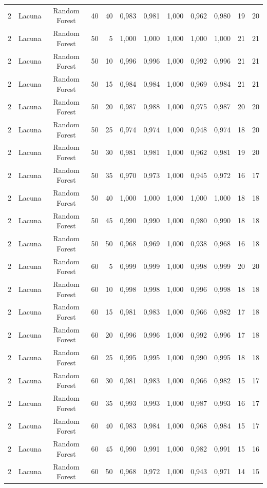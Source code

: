 \begin{longtable}{ccclrrrrrrrr}
2 & Lacuna & Random Forest & 40 & 40 & 0,983 & 0,981 & 1,000 & 0,962 & 0,980 & 19 & 20 \\
2 & Lacuna & Random Forest & 50 & 5 & 1,000 & 1,000 & 1,000 & 1,000 & 1,000 & 21 & 21 \\
2 & Lacuna & Random Forest & 50 & 10 & 0,996 & 0,996 & 1,000 & 0,992 & 0,996 & 21 & 21 \\
2 & Lacuna & Random Forest & 50 & 15 & 0,984 & 0,984 & 1,000 & 0,969 & 0,984 & 21 & 21 \\
2 & Lacuna & Random Forest & 50 & 20 & 0,987 & 0,988 & 1,000 & 0,975 & 0,987 & 20 & 20 \\
2 & Lacuna & Random Forest & 50 & 25 & 0,974 & 0,974 & 1,000 & 0,948 & 0,974 & 18 & 20 \\
2 & Lacuna & Random Forest & 50 & 30 & 0,981 & 0,981 & 1,000 & 0,962 & 0,981 & 19 & 20 \\
2 & Lacuna & Random Forest & 50 & 35 & 0,970 & 0,973 & 1,000 & 0,945 & 0,972 & 16 & 17 \\
2 & Lacuna & Random Forest & 50 & 40 & 1,000 & 1,000 & 1,000 & 1,000 & 1,000 & 18 & 18 \\
2 & Lacuna & Random Forest & 50 & 45 & 0,990 & 0,990 & 1,000 & 0,980 & 0,990 & 18 & 18 \\
2 & Lacuna & Random Forest & 50 & 50 & 0,968 & 0,969 & 1,000 & 0,938 & 0,968 & 16 & 18 \\
2 & Lacuna & Random Forest & 60 & 5 & 0,999 & 0,999 & 1,000 & 0,998 & 0,999 & 20 & 20 \\
2 & Lacuna & Random Forest & 60 & 10 & 0,998 & 0,998 & 1,000 & 0,996 & 0,998 & 18 & 18 \\
2 & Lacuna & Random Forest & 60 & 15 & 0,981 & 0,983 & 1,000 & 0,966 & 0,982 & 17 & 18 \\
2 & Lacuna & Random Forest & 60 & 20 & 0,996 & 0,996 & 1,000 & 0,992 & 0,996 & 17 & 18 \\
2 & Lacuna & Random Forest & 60 & 25 & 0,995 & 0,995 & 1,000 & 0,990 & 0,995 & 18 & 18 \\
2 & Lacuna & Random Forest & 60 & 30 & 0,981 & 0,983 & 1,000 & 0,966 & 0,982 & 15 & 17 \\
2 & Lacuna & Random Forest & 60 & 35 & 0,993 & 0,993 & 1,000 & 0,987 & 0,993 & 16 & 17 \\
2 & Lacuna & Random Forest & 60 & 40 & 0,983 & 0,984 & 1,000 & 0,968 & 0,984 & 15 & 17 \\
2 & Lacuna & Random Forest & 60 & 45 & 0,990 & 0,991 & 1,000 & 0,982 & 0,991 & 15 & 16 \\
2 & Lacuna & Random Forest & 60 & 50 & 0,968 & 0,972 & 1,000 & 0,943 & 0,971 & 14 & 15 \\

\end{longtable}
